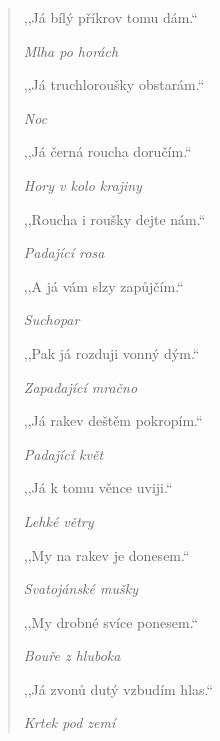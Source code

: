 \begin{verse}
\smallskip

,,Já bílý příkrov tomu dám.``

\smallskip

\textit{Mlha po horách}

\smallskip

,,Já truchloroušky obstarám.``

\smallskip

\textit{Noc}

\smallskip

,,Já černá roucha doručím.``

\smallskip

\textit{Hory v kolo krajiny}

\smallskip

,,Roucha i roušky dejte nám.``

\smallskip

\textit{Padající rosa}

\smallskip

,,A já vám slzy zapůjčím.``

\smallskip

\textit{Suchopar}

\smallskip

,,Pak já rozduji vonný dým.``

\smallskip

\textit{Zapadající mračno}

\smallskip

,,Já rakev deštěm pokropím.``

\smallskip

\textit{Padající květ}

\smallskip

,,Já k tomu věnce uviji.``

\smallskip

\textit{Lehké větry}

\smallskip

,,My na rakev je donesem.``

\smallskip

\textit{Svatojánské mušky}

\smallskip

,,My drobné svíce ponesem.``

\smallskip

\textit{Bouře z hluboka}

\smallskip

,,Já zvonů dutý vzbudím hlas.``

\smallskip

\textit{Krtek pod zemí}


\end{verse}
